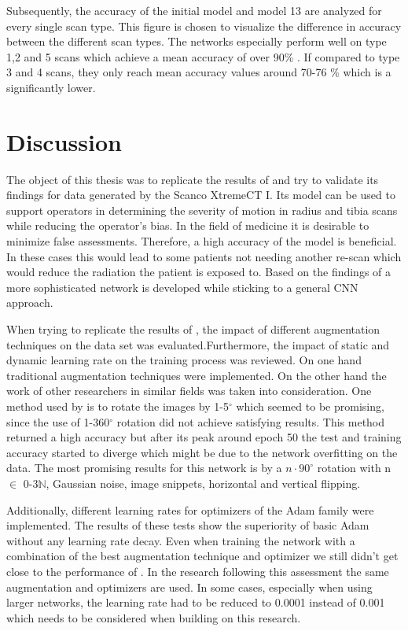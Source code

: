 \documentclass[
a4paper, 
12pt,
grayscalebody, %
abstract=on,
twoside, BCOR10mm, 12pt, DIV13,headinclude, footexclude, final, abstracton, openright
]{ibireprt}
\numberwithin{equation}{chapter}
\numberwithin{table}{chapter}
\numberwithin{figure}{chapter}
\numberwithin{algorithm}{chapter}
\numberwithin{example}{chapter}
\numberwithin{example}{chapter}
\begin{document}
Subsequently, the accuracy of the initial model and model 13 are analyzed for every single scan type. This figure is chosen to visualize the difference in accuracy between the different scan types. The networks especially perform well on type 1,2 and 5 scans which achieve a mean accuracy of over 90\% . If compared to type 3 and 4 scans, they only reach mean accuracy values around 70-76 \% which is a significantly lower.

\chapter{Discussion}

The object of this thesis was to replicate the results of \citet{Walle2023} and try to validate its findings for data generated by the Scanco XtremeCT I. Its model can be used to support operators in determining the severity of motion in radius and tibia scans while reducing the operator's bias. In the field of medicine it is desirable to minimize false assessments. Therefore, a high accuracy of the model is beneficial. In these cases this would lead to some patients not needing another re-scan which would reduce the radiation the patient is exposed to. Based on the findings  of \citet{Walle2023} a more sophisticated network is developed while sticking to a general CNN approach. 

When trying to replicate the results of \citet{Walle2023}, the impact of different augmentation techniques on the data set was evaluated.Furthermore, the impact of static and dynamic learning rate on the training process was reviewed. On one hand  traditional augmentation techniques were implemented. On the other hand the work of other researchers in similar fields was taken into consideration. One method used by \citet{Zhang2020} is to rotate the images by 1-5$^{\circ}$ which seemed to be promising, since the use of 1-360$^{\circ}$ rotation did not achieve satisfying results. This method returned a high accuracy but after its peak around epoch 50 the test and training accuracy started to diverge which might be due to the network overfitting on the data. The most promising results for this network is by a $ n \cdot 90^{\circ} $ rotation with n $\in$ {0-3}$\mathbb{N}$, Gaussian noise, image snippets, horizontal and vertical flipping. 

Additionally, different learning rates for optimizers of the Adam family were implemented. The results of these tests show the superiority of basic Adam without any learning rate decay. Even when training the network with a combination of the best augmentation technique and optimizer we still didn't get close to the performance of \citet{Walle2023}. In the research following this assessment the same augmentation and optimizers are used. In some cases, especially when using larger networks, the learning rate had to be reduced to 0.0001 instead of 0.001 which needs to be considered when building on this research.
\end{document}
